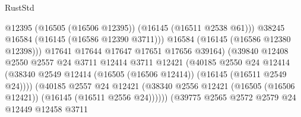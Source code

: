 \begin{lexlean}{RustStd}
\begin{coremodule}
                                                @12395
                                                (@16505 (@16506 @12395))
                                                (@16145 (@16511 @2538 @61)))
                                              @38245
                                              @16584
                                              (@16145 (@16586 @12390 @3711)))
                                            @16584
                                            (@16145 (@16586 @12380 @12398)))
                                          @17641
                                          @17644
                                          @17647
                                          @17651
                                          @17656
                                          @39164)
                                        (@39840
                                          @12408
                                          @2550
                                          @2557
                                          @24
                                          @3711
                                          @12414
                                          @3711
                                          @12421
                                          (@40185
                                            @2550
                                            @24
                                            @12414
                                            (@38340
                                              @2549
                                              @12414
                                              (@16505 (@16506 @12414))
                                              (@16145 (@16511 @2549 @24))))
                                          (@40185
                                            @2557
                                            @24
                                            @12421
                                            (@38340
                                              @2556
                                              @12421
                                              (@16505 (@16506 @12421))
                                              (@16145 (@16511 @2556 @24))))))
                                      (@39775
                                        @2565
                                        @2572
                                        @2579
                                        @24
                                        @12449
                                        @12458
                                        @3711

\end{coremodule}
\end{lexlean}
